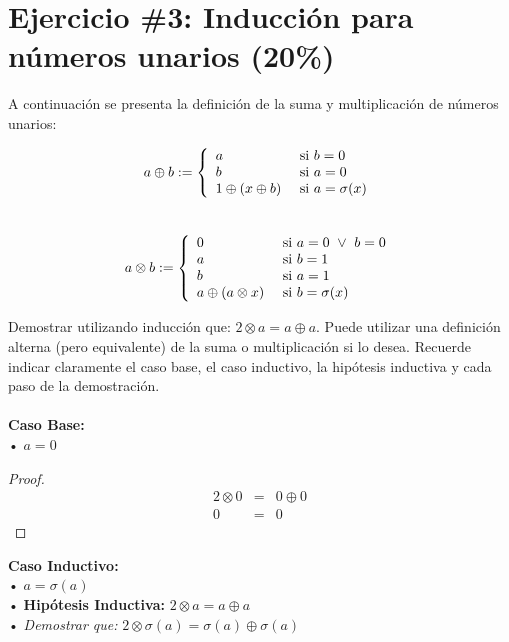 \documentclass[11pt,letterpaper]{article}
\begin{document}
\section*{Ejercicio \#3: Inducción para números unarios (20\%)}
\noindent A continuación se presenta la definición de la suma y multiplicación de números unarios:
\begin{multicols}{2}
\[
	a \oplus b := \left\{
    \begin{array}{l l}
    	a & \ \mbox{si } b=0 \\
    	b & \ \mbox{si } a=0 \\
        1 \oplus (x \oplus b) & \ \mbox{si } a=\sigma(x) \\
	\end{array}
    \right.
\]
\columnbreak
\\
\[
	a \otimes b := \left\{
    \begin{array}{l l}
    	0 & \ \mbox{si } a=0 \ \lor \ b=0 \\
    	a & \ \mbox{si } b=1 \\
        b & \ \mbox{si } a=1 \\
        a \oplus (a \otimes x) & \ \mbox{si } b=\sigma(x) \\
	\end{array}
    \right.
\]
\end{multicols}
\noindent Demostrar utilizando inducción que: $2 \otimes a = a \oplus a$. Puede utilizar una definición alterna (pero equivalente) de la suma o multiplicación si lo desea. Recuerde indicar claramente el caso base, el caso inductivo, la hipótesis inductiva y cada paso de la demostración.
\\\\
\noindent \textbf{\large Caso Base:} \\
\noindent • $a=0$
\begin{proof}
\begin{eqnarray}
2 \otimes 0 &=& 0 \oplus 0 \\
0 &=& 0
\end{eqnarray}
\end{proof}

\vspace{0.1cm}

\noindent \textbf{\large Caso Inductivo:}\\
\noindent • $a=\sigma(a)$ \\
\noindent • \textbf{Hipótesis Inductiva: } $2 \otimes a = a \oplus a$ \\
\noindent • \emph{Demostrar que:} $2 \otimes \sigma(a) = \sigma(a) \oplus \sigma(a)$
\end{document}
